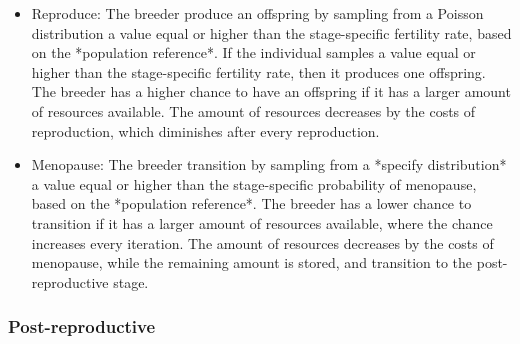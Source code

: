 \documentclass{article}
\begin{document}
\begin{itemize}
   \item Reproduce: The breeder produce an offspring by sampling from a Poisson distribution a value equal or higher than the stage-specific fertility rate, based on the *population reference*. If the individual samples a value equal or higher than the stage-specific fertility rate, then it produces one offspring. The breeder has a higher chance to have an offspring if it has a larger amount of resources available. The amount of resources decreases by the costs of reproduction, which diminishes after every reproduction.
    \item Menopause: The breeder transition by sampling from a *specify distribution* a value equal or higher than the stage-specific probability of menopause, based on the *population reference*. The breeder has a lower chance to transition if it has a larger amount of resources available, where the chance increases every iteration. The amount of resources decreases by the costs of menopause, while the remaining amount is stored, and transition to the post-reproductive stage.
\end{itemize}

\subsubsection{Post-reproductive}
\end{document}
